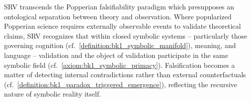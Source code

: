 \begin{remark}
\label{remark:bk7_unnamed_remark_04}
SRV transcends the Popperian falsifiability paradigm which presupposes an ontological separation between theory and observation. Where popularized Popperian science requires externally observable events to validate theoretical claims, SRV recognizes that within closed symbolic systems -- particularly those governing cognition (cf.~\ref{definition:bk1_symbolic_manifold}), meaning, and language -- validation and the object of validation participate in the same symbolic field (cf.~\ref{axiom:bk1_symbolic_primacy}). Falsification becomes a matter of detecting internal contradictions rather than external counterfactuals (cf.~\ref{definition:bk1_paradox_triggered_emergence}), reflecting the recursive nature of symbolic reality itself.
\end{remark}
